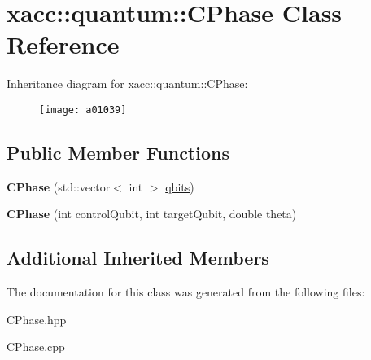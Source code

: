 \hypertarget{a01039}{}\section{xacc\+:\+:quantum\+:\+:C\+Phase Class Reference}
\label{a01039}
Inheritance diagram for xacc\+:\+:quantum\+:\+:C\+Phase\+:\begin{figure}[H]
\begin{center}
\leavevmode
\texttt{[image: a01039]}
\end{center}
\end{figure}
\subsection*{Public Member Functions}
\begin{DoxyCompactItemize}
\item 
\mbox{\label{a01039_a5899f838bc4b892d179f51fcf0ac4cc8}} 
{\bfseries C\+Phase} (std\+::vector$<$ int $>$ \hyperlink{a01015_a2a56be6c2519ea65df4d06f4abae1393}{qbits})
\item 
\mbox{\label{a01039_af642f499455f0065279a1e1d178c818f}} 
{\bfseries C\+Phase} (int control\+Qubit, int target\+Qubit, double theta)
\end{DoxyCompactItemize}
\subsection*{Additional Inherited Members}


The documentation for this class was generated from the following files\+:\begin{DoxyCompactItemize}
\item 
C\+Phase.\+hpp\item 
C\+Phase.\+cpp\end{DoxyCompactItemize}
